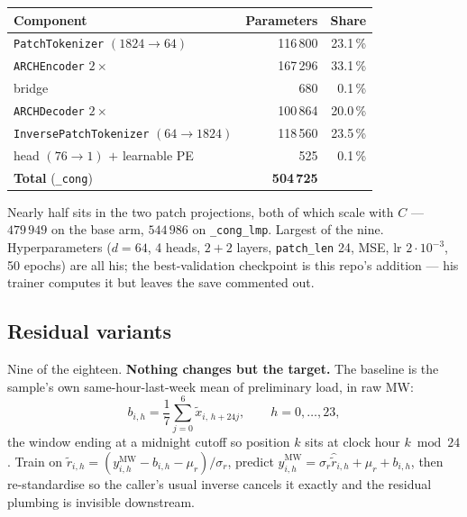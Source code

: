 \documentclass[11pt]{article}
\newcommand{\code}[1]{\texttt{\small #1}}
\begin{document}
\begin{center}\small
\begin{tabular}{@{}lrr@{}}
\toprule
Component & Parameters & Share \\
\midrule
\code{PatchTokenizer} $(1824 \to 64)$        & 116\,800 & 23.1\,\% \\
\code{ARCHEncoder} $2\times$                 & 167\,296 & 33.1\,\% \\
bridge                                       & \phantom{000}680 & \phantom{0}0.1\,\% \\
\code{ARCHDecoder} $2\times$                 & 100\,864 & 20.0\,\% \\
\code{InversePatchTokenizer} $(64 \to 1824)$ & 118\,560 & 23.5\,\% \\
head $(76 \to 1)$ $+$ learnable PE           & \phantom{00}\,525 & \phantom{0}0.1\,\% \\
\midrule
\textbf{Total} (\code{\_cong})               & \textbf{504\,725} & \\
\bottomrule
\end{tabular}
\end{center}

\noindent
Nearly half sits in the two patch projections, both of which scale with $C$ ---
$479\,949$ on the base arm, $544\,986$ on \code{\_cong\_lmp}. Largest of the nine.
Hyperparameters ($d{=}64$, 4 heads, $2{+}2$ layers, \code{patch\_len} 24, MSE,
lr $2{\cdot}10^{-3}$, 50 epochs) are all his; the best-validation checkpoint is this
repo's addition --- his trainer computes it but leaves the save commented out.

\subsection{Residual variants}\label{sec:resid}

Nine of the eighteen. \textbf{Nothing changes but the target.} The baseline is the
sample's own same-hour-last-week mean of preliminary load, in raw MW:
\begin{equation}
  b_{i,h} = \frac17\sum_{j=0}^{6}\tilde x_{i,\,h+24j},
  \qquad h = 0,\ldots,23 ,
\end{equation}
the window ending at a midnight cutoff so position $k$ sits at clock hour
$k \bmod 24$. Train on $\tilde r_{i,h} = (y^{\text{MW}}_{i,h} - b_{i,h} - \mu_r)/\sigma_r$,
predict $\hat y^{\text{MW}}_{i,h} = \sigma_r \hat{\tilde r}_{i,h} + \mu_r + b_{i,h}$,
then re-standardise so the caller's usual inverse cancels it exactly and the
residual plumbing is invisible downstream.
\end{document}
